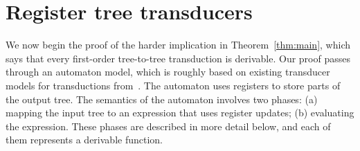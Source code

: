 


\section{Register tree transducers}
\label{sec:stt}
We now begin the proof of the harder implication in Theorem~\ref{thm:main}, which says that every first-order tree-to-tree transduction is derivable. Our proof passes  through an automaton model, which  is roughly based on existing transducer models for \mso transductions from~\cite{bloem_comparison_2000,alur2017streaming}.
The automaton  uses registers to store parts of the output tree. The semantics of the automaton involves two phases: (a) mapping the input tree to an expression that uses register updates; (b) evaluating the expression. These phases are described in more detail below, and each of them represents a derivable function.

%
%


